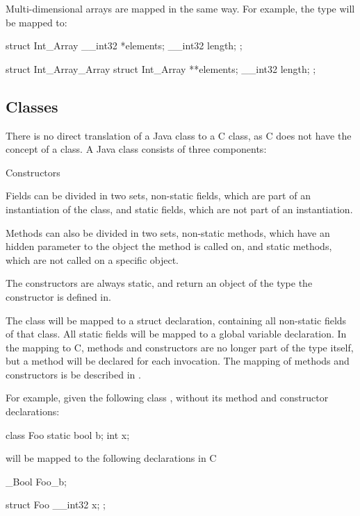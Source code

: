 Multi-dimensional arrays are mapped in the same way. For example, the type 
 will be mapped to:

\begin{C}
struct Int_Array {
    __int32 *elements;
    __int32 length;
};

struct Int_Array_Array {
    struct Int_Array **elements;
    __int32 length;
};
\end{C}

\subsection{Classes}
There is no direct translation of a Java class to a C class, as C does not have 
the concept of a class. A Java class consists of three components:

\begin{labeling}{Constructors}
    \item [Fields] Fields can be divided in two sets, non-static fields, which 
    are part of an instantiation of the class, and static fields, which are not
    part of an instantiation.
    \item [Methods] Methods can also be divided in two sets, non-static methods,
    which have an hidden  parameter to the object the method is
    called on, and static methods, which are not called on a specific object. 
    \item [Constructors] The constructors are always static, and return an object
    of the type the constructor is defined in.
\end{labeling}

The class will be mapped to a struct declaration, containing all non-static
fields of that class. All static fields will be mapped to a global variable 
declaration. In the mapping to C, methods and constructors are no longer part of 
the type itself, but a method will be declared for each invocation. The mapping 
of methods and constructors is be described in .

For example, given the following class , without its method and 
constructor declarations:

\begin{Java}
class Foo {
    static bool b;
    int x;
}
\end{Java}

will be mapped to the following declarations in C

\begin{C}
_Bool Foo_b;

struct Foo {
    __int32 x;
};
\end{C}

